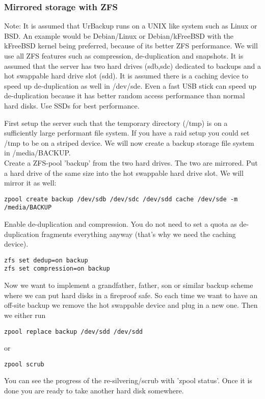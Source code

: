 \documentclass[a4paper,10pt]{article}
\begin{document}
\subsubsection{Mirrored storage with ZFS}
\label{subsec_ZFS_setup}

Note: It is assumed that UrBackup runs on a UNIX like system such as Linux or BSD. An example would be Debian/Linux or Debian/kFreeBSD with the kFreeBSD kernel being preferred, because of its better ZFS performance. We will use all ZFS features such as compression, de-duplication and snapshots. It is assumed that the server has two hard drives (sdb,sdc) dedicated to backups and a hot swappable hard drive slot (sdd). It is assumed there is a caching device to speed up de-duplication as well in /dev/sde. Even a fast USB stick can speed up de-duplication because it has better random access performance than normal hard disks. Use SSDs for best performance. 

First setup the server such that the temporary directory (/tmp) is on a sufficiently large performant file system. If you have a raid setup you could set /tmp to be on a striped device. We will now create a backup storage file system in /media/BACKUP.\\
Create a ZFS-pool 'backup' from the two hard drives. The two are mirrored. Put a hard drive of the same size into the hot swappable hard drive slot. We will mirror it as well:
\begin{verbatim}
zpool create backup /dev/sdb /dev/sdc /dev/sdd cache /dev/sde -m /media/BACKUP
\end{verbatim}
Enable de-duplication and compression. You do not need to set a quota as de-duplication fragments everything anyway (that's why we need the caching device).
\begin{verbatim}
zfs set dedup=on backup
zfs set compression=on backup
\end{verbatim}
Now we want to implement a grandfather, father, son or similar backup scheme where we can put hard disks in a fireproof safe. So each time we want to have an off-site backup we remove the hot swappable device and plug in a new one. Then we either run
\begin{verbatim}
zpool replace backup /dev/sdd /dev/sdd
\end{verbatim}
or
\begin{verbatim}
zpool scrub
\end{verbatim}
You can see the progress of the re-silvering/scrub with 'zpool status'. Once it is done you are ready to take another hard disk somewhere.
\end{document}
